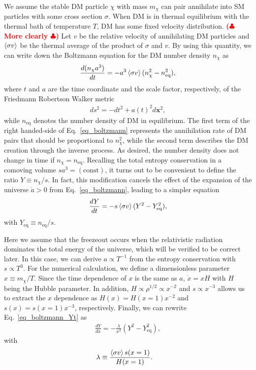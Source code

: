 \documentclass[12pt,twoside,book]{article}
\def\rem#1{ {\bf\textcolor{red}{($\clubsuit$ #1 $\clubsuit$)}}}
\begin{document}
We assume the stable DM particle $\chi$ with mass $m_\chi$ can pair
annihilate into SM particles with some cross section $\sigma$.  When
DM is in thermal equilibrium with the thermal bath of temperature $T$,
DM has some fixed velocity distribution.  \rem{More clearly}  Let $v$
be the relative velocity of annihilating DM particles and
$\Braket{\sigma v}$ be the thermal average of the product of $\sigma$
and $v$.  By using this quantity, we can write down the Boltzmann
equation for the DM number density $n_\chi$ as
\begin{align}
 \frac{d (n_\chi a^3)}{d t} =
 - a^3 \Braket{\sigma v} (n_\chi^2 - n_{\mathrm{eq}}^2),\label{eq_boltzmann}
\end{align}
where $t$ and $a$ are the time coordinate and the scale factor,
respectively, of the Friedmann Robertson Walker metric
\begin{align}
 d s^2 = - d t^2 + a(t)^2 d \bm{x}^2,
\end{align}
while $n_{\mathrm{eq}}$ denotes the number density of DM in
equilibrium.  The first term of the right handed-side of
Eq.~\eqref{eq_boltzmann} represents the annihilation rate of DM pairs
that should be proportional to $n_\chi^2$, while the second term
describes the DM creation through the inverse process.  As desired,
the number density does not change in time if $n_\chi =
n_{\mathrm{eq}}$.  Recalling the total entropy conservation in a
comoving volume $s a^3 = (\mathrm{const})$, it turns out to be
convenient to define the ratio $Y \equiv n_\chi / s$.  In fact, this
modification cancels the effect of the expansion of the universe
$\dot{a} > 0$ from Eq.~\eqref{eq_boltzmann}, leading to a simpler
equation
\begin{align}
 \frac{d Y}{d t} =
 -s \Braket{\sigma v} (Y^2 - Y_{\mathrm{eq}}^2),\label{eq_boltzmann_Yt}
\end{align}
with $Y_{\mathrm{eq}} \equiv n_{\mathrm{eq}} / s$.

Here we assume that the freezeout occurs when the relativistic
radiation dominates the total energy of the universe, which will be
verified to be correct later.  In this case, we can derive $a \propto
T^{-1}$ from the entropy conservation with $s \propto T^3$.  For the
numerical calculation, we define a dimensionless parameter $x \equiv
m_\chi / T$.  Since the time dependence of $x$ is the same as $a$,
$\dot{x} = x H$ with $H$ being the Hubble parameter.  In addition, $H
\propto \rho^{1/2} \propto x^{-2}$ and $s \propto x^{-3}$ allows us to
extract the $x$ dependence as $H(x) = H(x=1) x^{-2}$ and $s(x) =
s(x=1) x^{-3}$, respectively.  Finally, we can rewrite
Eq.~\eqref{eq_boltzmann_Yt} as
\begin{align}
 \frac{d Y}{d x} = -\frac{\lambda}{x^2} (Y^2 - Y_{\mathrm{eq}}^2),\label{eq_boltzmann_Yx}
\end{align}
with
\begin{align}
 \lambda &\equiv \frac{\Braket{\sigma v} s(x=1)}{H(x=1)}.\label{eq_lambda}
\end{align}
\end{document}
